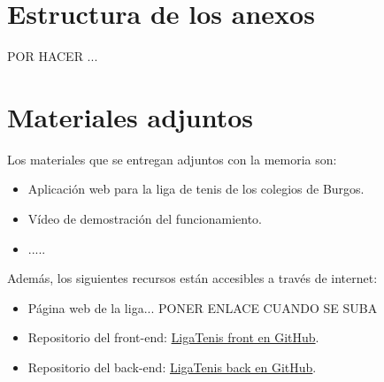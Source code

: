 \section{Estructura de los anexos}\label{estructura-anexos}

POR HACER ...


\section{Materiales adjuntos}\label{materiales-adjuntos}

Los materiales que se entregan adjuntos con la memoria son: 

\begin{itemize}
\tightlist
\item
	Aplicación web para la liga de tenis de los colegios de Burgos.
\item	
	Vídeo de demostración del funcionamiento.
\item	
	.....
\end{itemize}

Además, los siguientes recursos están accesibles a través de internet:

\begin{itemize}
\tightlist
\item
  Página web de la liga... PONER ENLACE CUANDO SE SUBA

\item Repositorio del front-end: 
    \href{https://github.com/Nachoozg/tfg}{LigaTenis front en GitHub}.
    
\item Repositorio del back-end: 
    \href{https://github.com/Nachoozg/tfg-back}{LigaTenis back en GitHub}.

\end{itemize}
